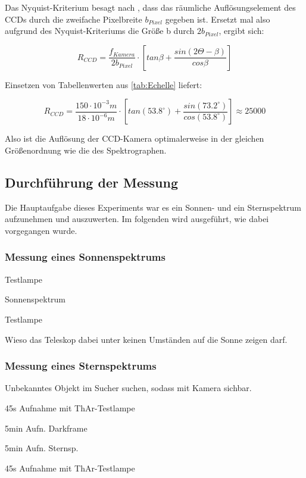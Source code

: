 Das Nyquist-Kriterium besagt nach \cite{ronomischesPraktikum}, dass das räumliche Auflösungselement des CCDs durch die zweifache Pixelbreite $ b_{Pixel} $ gegeben ist. Ersetzt mal also aufgrund des Nyquist-Kriteriums die Größe b durch $ 2b_{Pixel} $, ergibt sich:

\begin{equation}
R_{CCD} = \frac{f_{Kamera}}{2b_{Pixel}}\cdot \left[tan \beta + \frac{sin(2\Theta-\beta)}{cos \beta}\right]
\end{equation}

Einsetzen von Tabellenwerten aus \ref{tab:Echelle} liefert:
 
\begin{equation}
R_{CCD} = \frac{150\cdot10^{-3}m}{18\cdot10^{-6}m}\cdot \left[tan (53.8^{\circ}) + \frac{sin(73.2^{\circ})}{cos (53.8^{\circ})}\right] \approx 25000
\end{equation}

Also ist die Auflösung der CCD-Kamera optimalerweise in der gleichen Größenordnung wie die des Spektrographen.
			
\subsection{Durchführung der Messung}
Die Hauptaufgabe dieses Experiments war es ein Sonnen- und ein Sternspektrum aufzunehmen und auszuwerten. Im folgenden wird ausgeführt, wie dabei vorgegangen wurde.

\subsubsection{Messung eines Sonnenspektrums}

Testlampe

Sonnenspektrum

Testlampe

Wieso das Teleskop dabei unter keinen Umständen auf die Sonne zeigen darf.

\subsubsection{Messung eines Sternspektrums}

Unbekanntes Objekt im Sucher suchen, sodass mit Kamera sichbar.

45s Aufnahme mit ThAr-Testlampe

5min Aufn. Darkframe

5min Aufn. Sternsp.

45s Aufnahme mit ThAr-Testlampe





